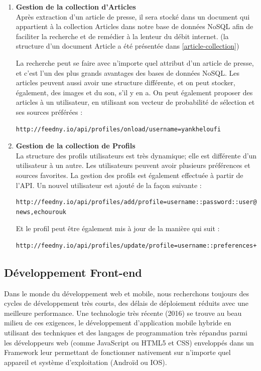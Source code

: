        \begin{enumerate}[leftmargin=*]
    \item\textbf{Gestion de la collection d'Articles}\\
    Après extraction d'un article de presse, il sera stocké dans un document qui appartient à la collection Articles dans notre base de données NoSQL afin de faciliter la recherche et de remédier à la lenteur du débit internet. (la structure d'un document Article a été présentée dans \autoref{article-collection})
    
    La recherche peut se faire avec n'importe quel attribut d'un article de presse, et c'est l'un des plus grands avantages des bases de données NoSQL. Les articles peuvent aussi avoir une structure différente, et on peut stocker, également, des images et du son, s'il y en a. On peut également proposer des articles à un utilisateur, en utilisant son vecteur de probabilité de sélection et ses sources préférées : 
    
    \begin{lstlisting}[style=api] 
    http://feedny.io/api/profiles/onload/username=yankheloufi
    \end{lstlisting} 

\item\textbf{Gestion de la collection de Profils}\\
La structure des profils utilisateurs est très dynamique; elle est différente d'un utilisateur à un autre. Les utilisateurs peuvent avoir plusieurs préférences et sources favorites. La gestion des profils est également effectuée à partir de l'API. 
Un nouvel utilisateur est ajouté de la façon suivante :   
\begin{lstlisting}[style=api] 
http://feedny.io/api/profiles/add/profile=username::password::user@hey.com::sport,religion::bbc-news,echourouk
\end{lstlisting} 

Et le profil peut être également mis à jour de la manière qui suit : 
\begin{lstlisting}[style=api] 
http://feedny.io/api/profiles/update/profile=username::preferences+algeria
\end{lstlisting}            
\end{enumerate} 

\subsection{Développement Front-end}
Dans le monde du développement web et mobile, nous recherchons toujours des cycles de développement très courts, des délais de déploiement réduits avec une meilleure performance. Une technologie très récente (2016) se trouve au beau milieu de ces exigences, le développement d'application mobile hybride en utilisant des techniques et des langages de programmation très répandus parmi les développeurs web (comme JavaScript ou HTML5 et CSS) enveloppés dans un Framework leur permettant de fonctionner nativement sur n'importe quel appareil et système d'exploitation (Androïd ou IOS).

